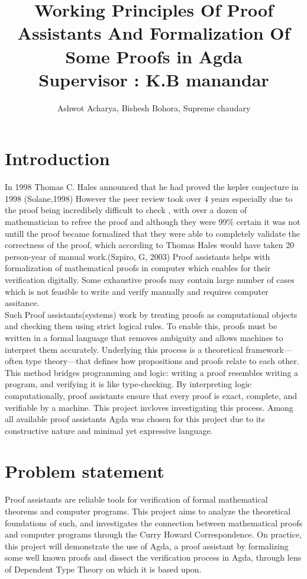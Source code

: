 \documentclass{article}
\title{
    {Working Principles Of Proof Assistants And Formalization Of Some Proofs in Agda}\\
    {\large Supervisor : K.B manandar}\\


    }
\author{ Ashwot Acharya, Bishesh Bohora, Supreme chaudary}
\begin{document}
\maketitle

\pagebreak
\section{Introduction}
In 1998 Thomas C. Hales announced that he had proved the kepler conjecture in 1998 (Solane,1998) However the peer review took over 4 years especially due to the proof being incredibely difficult to check , with over a dozen of mathematician to refree the proof and although 
they were 99\% certain it was not untill the proof became formalized that they were able to completely validate the correctness of the proof, which according to Thomas Hales would have taken 20 person-year of manual work.(Szpiro, G, 2003)
Proof assistants helps with formalization of mathematical proofs in computer which enables for their verification digitally.
Some exhaustive proofs may contain large number of cases which is not feasible to write and verify manually and requires computer assitance.\\ 
Such Proof assistants(systems) work by treating proofs as computational objects and checking them using strict logical rules. To enable this, proofs must be written in a formal language that removes ambiguity and allows machines to interpret them accurately. Underlying this process is a theoretical framework—often type theory—that defines how propositions and proofs relate to each other.
\\
This method bridges programming and logic: writing a proof resembles writing a program, and verifying it is like type-checking. By interpreting logic computationally, proof assistants ensure that every proof is exact, complete, and verifiable by a machine. This project invloves investigating this process. Among all available proof assistants Agda was chosen for this project due to its constructive nature and minimal yet expressive language.
\section{Problem statement}
Proof assistants are reliable tools for verification of formal mathematical theorems and computer programs. This project aims to analyze the theoretical foundations of such, and investigates the connection between mathematical proofs and computer programs through the Curry Howard Correspondence. On practice, this project will demonstrate the use of Agda, a proof assistant by formalizing some well known proofs and dissect the verification process in Agda, through lens of Dependent Type Theory on which it is based upon. 
\end{document}
